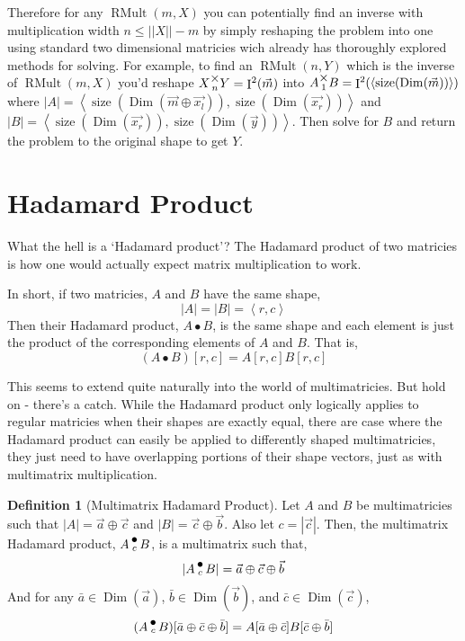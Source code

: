 \documentclass[12pt]{book}
\theoremstyle{plain}
\theoremstyle{definition}
\newtheorem{definition}{Definition}[chapter]
\theoremstyle{ppart}
\theoremstyle{case}
\theoremstyle{solution}
\DeclareMathOperator{\Dim}{Dim}
\DeclareMathOperator{\Ident}{I}
\DeclareMathOperator{\RMult}{RMult}
\DeclareMathOperator{\size}{size}
\newcommand{\mmult}[1]{\text{\raisebox{1ex}{$\underset{#1}{\times}$}}}
\newcommand{\dmult}[1]{\text{\raisebox{1ex}{$\underset{#1}{\,\bullet\,}$}}}
\begin{document}
Therefore for any $\RMult(m,X)$ you can potentially find an inverse with
multiplication width $n \le ||X||-m$ by simply reshaping the problem into
one using standard two dimensional matricies wich already has thoroughly
explored methods for solving.
For example, to find an $\RMult(n,Y)$ which is the inverse of $\RMult(m,X)$
you'd reshape $X \mmult{n} Y = \Ident^2(\vec{m})$ into $A \mmult{1} B = \Ident^2(\left<\size(\Dim(\vec{m}))\right>)$
where $|A| = \left<\size(\Dim(\vec{m} \oplus \vec{x_l})), \size(\Dim(\vec{x_r}))\right>$
and   $|B| = \left<\size(\Dim(\vec{x_r})),  \size(\Dim(\vec{y}))\right>$.
Then solve for $B$ and return the problem to the original shape to get $Y$.


\section{Hadamard Product}

What the hell is a `Hadamard product'? The Hadamard product \cite{wiki:hadamard}
of two matricies is how one would actually expect matrix multiplication to work.

In short, if two matricies, $A$ and $B$ have the same shape,
\[ |A| = |B| = \left<r,c\right> \]
Then their Hadamard product, $A \bullet B$, is the same shape and each element
is just the product of the corresponding elements of $A$ and $B$. That is,
\[ (A \bullet B)[r,c] = A[r,c] B[r,c] \]

This seems to extend quite naturally into the world of multimatricies.
But hold on - there's a catch. While the Hadamard product only logically applies
to regular matricies when their shapes are exactly equal, there are case where
the Hadamard product can easily be applied to differently shaped multimatricies,
they just need to have overlapping portions of their shape vectors, just as
with multimatrix multiplication.

\begin{definition}[Multimatrix Hadamard Product]
\label{multi_had_prod}
Let $A$ and $B$ be multimatricies such that $|A| = \vec{a} \oplus \vec{c}$
and $|B| = \vec{c} \oplus \vec{b}$. Also let $c = |\vec{c}|$.
Then, the multimatrix Hadamard product, $A \dmult{c} B$, is a multimatrix
such that,
\[ |A \dmult{c} B| = \vec{a} \oplus \vec{c} \oplus \vec{b} \]
And for any $\bar{a} \in \Dim(\vec{a})$, $\bar{b} \in \Dim(\vec{b})$,
and $\bar{c} \in \Dim(\vec{c})$,
\[
  (A \dmult{c} B)[\bar{a} \oplus \bar{c} \oplus \bar{b}]
  = A[\bar{a} \oplus \bar{c}] B[\bar{c} \oplus \bar{b}]
\]
\end{definition}
\end{document}
